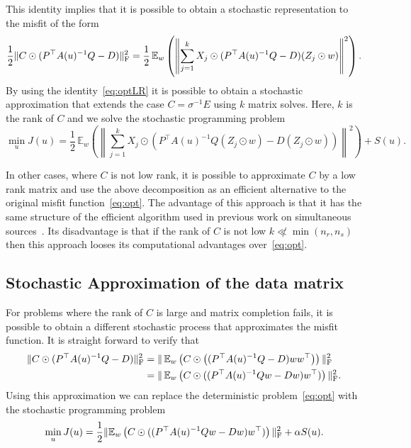 \documentclass[12pt]{article}
\newcommand{\hf}{\frac12}
\newcommand{\bbE}{\mathbb{E}}
\begin{document}
This identity implies that it is possible to obtain a stochastic representation to the misfit of the form
\begin{equation} \label{eq:optLR}
 \hf \|C \odot (P^{\top}A(u)^{-1}Q - D)\|_{\rm F}^{2}  = \hf \,
\bbE_{w}\left(\left\|\sum_{j=1}^{k} X_{j} \odot (P^{\top}A(u)^{-1}Q - D) (Z_{j} \odot w) \right\|^{2} \right).
\end{equation}
By using the identity~\eqref{eq:optLR} it is possible to obtain a stochastic approximation that extends the case
$C = \sigma^{-1} E$ using $k$ matrix solves. Here, $k$ is the rank of $C$  and we solve the stochastic programming problem
\begin{equation}
\label{clropt}
\min_{u} J(u) = \hf\, \bbE_{w}\left( \left\|\sum_{j=1}^{k} X_{j} \odot  (P^{\top}A(u)^{-1}Q (Z_{j} \odot w)  - D (Z_{j} \odot w) ) \right\|^{2} \right) + S(u).
\end{equation}

In other cases, where $C$ is not low rank, it is possible to approximate $C$ by a low rank matrix and use the above decomposition as an efficient alternative to the original misfit function~\eqref{eq:opt}. The advantage of this approach is that it has the same structure of the efficient algorithm used in previous work on simultaneous sources~\cite{HaberChungHerrmann2011}. Its disadvantage is that if the rank of $C$ is not low $k \not\ll \min(n_{r},n_{s})$ then this approach looses its computational advantages over~\eqref{eq:opt}.

\subsection{Stochastic Approximation of the data matrix}
\label{meth3}
For problems where the rank of $C$ is large and matrix completion fails, it is possible to obtain a different stochastic process that approximates the misfit function. It is straight forward to verify that
\begin{align*}
\|C \odot (P^{\top}A(u)^{-1}Q - D)\|_{\rm F}^{2} &= \|\, \bbE_{w} \left( C \odot \left( (P^{\top}A(u)^{-1}Q - D) ww^{\top} \right) \right) \|_{\rm F}^{2}\\
& = \| \, \bbE_{w} \left( C \odot ( (P^{\top}A(u)^{-1}Qw - Dw) w^{\top} ) \right) \|_{\rm F}^{2}.
\end{align*}
Using this approximation we can replace the deterministic problem~\eqref{eq:opt} with the stochastic programming problem
\begin{equation}
\label{absExp}
\min_{u} J(u) =  \hf \|  \bbE_{w} \left( C \odot ( (P^{\top}A(u)^{-1}Qw - Dw) w^{\top} ) \right) \|_{\rm F}^{2} + \alpha S(u).
\end{equation}
\end{document}
